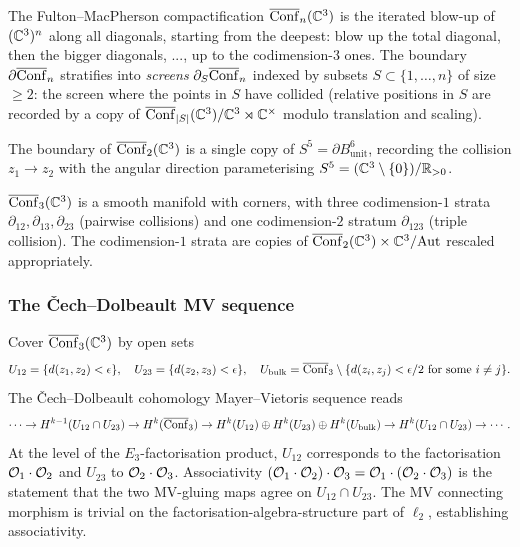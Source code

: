\begin{definition}\ClaimStatusDefinition
\label{opus12:def:fm-compact}
The Fulton--MacPherson compactification $\overline{\mathrm{Conf}}_n(\mathbb{C}^3)$
is the iterated blow-up of $(\mathbb{C}^3)^n$ along all diagonals,
starting from the deepest: blow up the total diagonal, then the
bigger diagonals, ..., up to the codimension-$3$ ones. The boundary
$\partial \overline{\mathrm{Conf}}_n$ stratifies into \emph{screens}
$\partial_S \overline{\mathrm{Conf}}_n$ indexed by subsets $S \subset
\{1, \ldots, n\}$ of size $\ge 2$: the screen where the points in
$S$ have collided (relative positions in $S$ are recorded by a copy
of $\overline{\mathrm{Conf}}_{|S|}(\mathbb{C}^3)/\mathbb{C}^3 \rtimes \mathbb{C}^\times$
modulo translation and scaling).

The boundary of $\overline{\mathrm{Conf}}_2(\mathbb{C}^3)$ is a single copy of
$S^5 = \partial B^6_{\mathrm{unit}}$, recording the collision
$z_1 \to z_2$ with the angular direction parameterising
$S^5 = (\mathbb{C}^3 \setminus \{0\})/\mathbb{R}_{> 0}$.

$\overline{\mathrm{Conf}}_3(\mathbb{C}^3)$ is a smooth manifold with corners, with
three codimension-$1$ strata $\partial_{12}, \partial_{13},
\partial_{23}$ (pairwise collisions) and one codimension-$2$ stratum
$\partial_{123}$ (triple collision). The codimension-$1$ strata
are copies of
$\overline{\mathrm{Conf}}_2(\mathbb{C}^3) \times \mathbb{C}^3 / \mathrm{Aut}$
rescaled appropriately.
\end{definition}

\subsubsection{The Čech--Dolbeault MV sequence}

\begin{theorem}\ClaimStatusTheorem
\label{opus12:thm:mv-assoc}
Cover $\overline{\mathrm{Conf}}_3(\mathbb{C}^3)$ by open sets
\[
U_{12} = \{d(z_1, z_2) < \epsilon\}, \quad
U_{23} = \{d(z_2, z_3) < \epsilon\}, \quad
U_{\mathrm{bulk}} = \overline{\mathrm{Conf}}_3 \setminus
\{d(z_i, z_j) < \epsilon/2 \text{ for some } i \ne j\}.
\]
The Čech--Dolbeault cohomology Mayer--Vietoris sequence reads
\[
\cdots \to H^{k-1}(U_{12} \cap U_{23}) \to H^k(\overline{\mathrm{Conf}}_3)
\to H^k(U_{12}) \oplus H^k(U_{23}) \oplus H^k(U_{\mathrm{bulk}})
\to H^k(U_{12} \cap U_{23}) \to \cdots.
\]
At the level of the $E_3$-factorisation product,
$U_{12}$ corresponds to the factorisation $\mathcal{O}_1 \cdot \mathcal{O}_2$ and
$U_{23}$ to $\mathcal{O}_2 \cdot \mathcal{O}_3$. Associativity
$(\mathcal{O}_1 \cdot \mathcal{O}_2) \cdot \mathcal{O}_3 = \mathcal{O}_1 \cdot (\mathcal{O}_2 \cdot \mathcal{O}_3)$
is the statement that the two MV-gluing maps agree on
$U_{12} \cap U_{23}$. The MV connecting morphism is trivial on the
factorisation-algebra-structure part of $\ell_2$, establishing
associativity.
\end{theorem}

